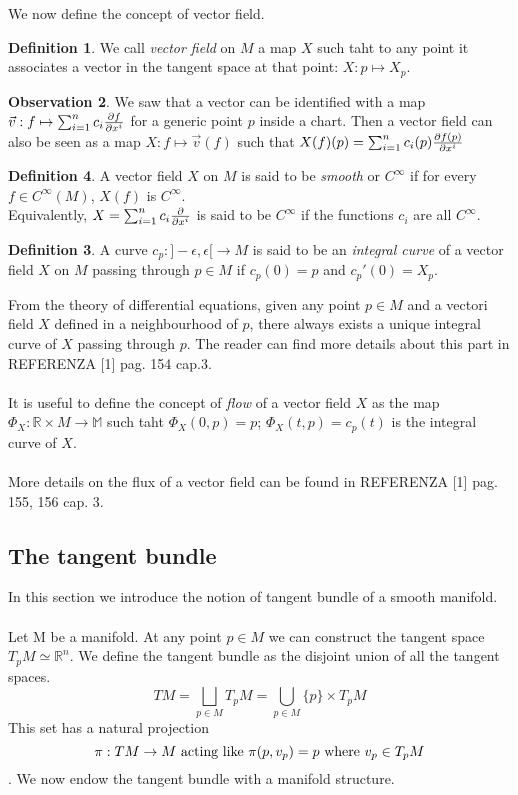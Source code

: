 \documentclass[12pt,a4paper]{report}
\theoremstyle{definition}
\newtheorem{Def}{Definition}[chapter]
\theoremstyle{Theorem}
\theoremstyle{definition}
\theoremstyle{definition}
\newtheorem{Obs}[Def]{Observation}
\begin{document}
		We now define the concept of vector field.
		\begin{Def}
			We call \textit{vector field} on $M$ a map $X$ such taht to any point it associates a vector in the tangent space at that point: $X:p\mapsto X_p$. 
		\end{Def}
		\begin{Obs}
			We saw that a vector can be identified with a map $\vec{v}:f\mapsto\sum_{i=1}^{n}c_i{\partial f\over \partial x^i}$ for a generic point $p$ inside a chart. Then a vector field can also be seen as a map $X:f\mapsto\vec{v}(f)$ such that $X(f)(p)=\sum_{i=1}^{n}c_i(p){\partial f(p)\over \partial x^i}$
		\end{Obs}
		\begin{Def}
			A vector field $X$ on $M$ is said to be \textit{smooth} or $C^\infty$ if for every $f\in C^\infty(M)$, $X(f)$ is $C^\infty$.
			\\
			Equivalently, $X=\sum_{i=1}^{n}c_i{\partial\over \partial x^i}$ is said to be $C^\infty$ if the functions $c_i$ are all $C^\infty$.
			\begin{Def}
				A curve $c_p:]-\epsilon,\epsilon[\rightarrow M$ is said to be an \textit{integral curve} of a vector field $X$ on $M$ passing through $p\in M$ if $c_p(0)=p$ and $c_p'(0)=X_p$.
			\end{Def}
			From the theory of differential equations, given any point $p\in M$ and a vectori field $X$ defined in a neighbourhood of $p$, there always exists a unique integral curve of $X$ passing through $p$. The reader can find more details about this part in REFERENZA [1] pag. 154 cap.3.\\
			\\
			It is useful to define the concept of \textit{flow} of a vector field $X$ as the map $\Phi_X:\mathbb{R}\times M\rightarrow\mathbb{M}$ such taht $\Phi_X(0,p)=p$; $\Phi_X(t,p)=c_p(t)$ is the integral curve of $X$.\\
			\\
			More details on the flux of a vector field can be found in REFERENZA [1] pag. 155, 156 cap. 3.
		\end{Def}
		\subsection{The tangent bundle}
		In this section we introduce the notion of tangent bundle of a smooth manifold.\\
		\\
		Let M be a manifold. At any point $p\in M$ we can construct the tangent space $T_pM\simeq \mathbb{R}^n$. We define the tangent bundle as the disjoint union of all the tangent spaces.
		$$TM=\bigsqcup_{p\in M}T_pM=\bigcup_{p\in M} \{p\}\times T_pM$$
		This set has a natural projection 
		$$\pi:TM\rightarrow M\hbox{ acting like }\pi(p,v_p)=p \hbox{ where }v_p\in T_pM$$.  
		We now endow the tangent bundle with a manifold structure.
\end{document}
